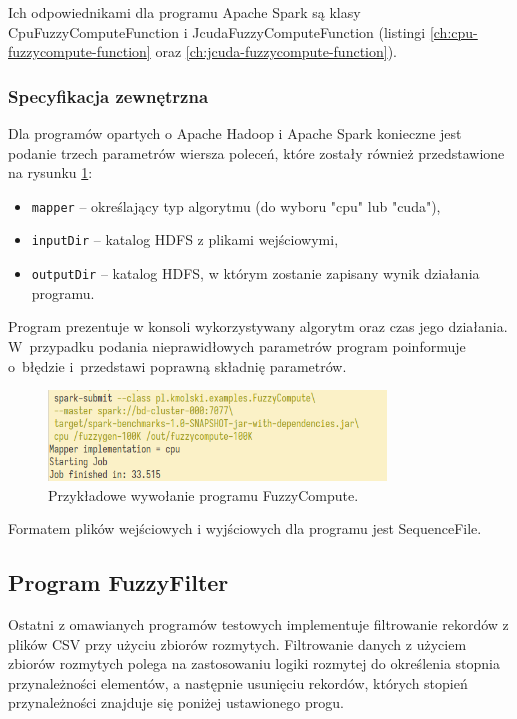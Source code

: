 Ich odpowiednikami dla programu Apache Spark są klasy CpuFuzzyComputeFunction i JcudaFuzzyComputeFunction (listingi \ref{ch:cpu-fuzzycompute-function} oraz \ref{ch:jcuda-fuzzycompute-function}).

\subsubsection*{Specyfikacja zewnętrzna}

Dla programów opartych o Apache Hadoop i Apache Spark konieczne jest podanie trzech parametrów wiersza poleceń, które zostały również przedstawione na rysunku \ref{fig:fuzzycompute:run}:
\begin{itemize}
	\item \lstinline{mapper} -- określający typ algorytmu (do wyboru "cpu" lub "cuda"),
	\item \lstinline{inputDir} -- katalog HDFS z plikami wejściowymi,
	\item \lstinline{outputDir} -- katalog HDFS, w którym zostanie zapisany wynik działania programu.
\end{itemize}

Program prezentuje w konsoli wykorzystywany algorytm oraz czas jego działania. W~przypadku podania
nieprawidłowych parametrów program poinformuje o~błędzie i~przedstawi poprawną składnię parametrów.

\begin{figure}[h]
	\centering
	\includegraphics[width=0.8\textwidth]{graf/FuzzyCompute-interface.png}
	\caption{Przykładowe wywołanie programu FuzzyCompute.}
	\label{fig:fuzzycompute:run}
\end{figure}

Formatem plików wejściowych i wyjściowych dla programu jest SequenceFile.

\subsection{Program FuzzyFilter}

Ostatni z omawianych programów testowych implementuje filtrowanie rekordów z plików CSV przy użyciu
zbiorów rozmytych. Filtrowanie danych z użyciem zbiorów rozmytych polega na zastosowaniu logiki
rozmytej do określenia stopnia przynależności elementów, a następnie usunięciu rekordów, których
stopień przynależności znajduje się poniżej ustawionego progu.

